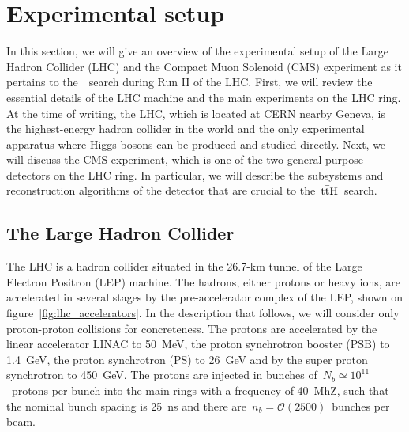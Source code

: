 \chapter{Experimental setup}
In this section, we will give an overview of the experimental setup of the Large Hadron Collider (LHC) and the Compact Muon Solenoid (CMS) experiment as it pertains to the~\ttH~search during Run II of the LHC. First, we will review the essential details of the LHC machine and the main experiments on the LHC ring. At the time of writing, the LHC, which is located at CERN nearby Geneva, is the highest-energy hadron collider in the world and the only experimental apparatus where Higgs bosons can be produced and studied directly. Next, we will discuss the CMS experiment, which is one of the two general-purpose detectors on the LHC ring. In particular, we will describe the subsystems and reconstruction algorithms of the detector that are crucial to the~$\mathrm{t} \bar{\mathrm{t}} \mathrm{H}$~search.

\section{The Large Hadron Collider}
The LHC is a hadron collider situated in the 26.7-km tunnel of the Large Electron Positron (LEP) machine. The hadrons, either protons or heavy ions, are accelerated in several stages by the pre-accelerator complex of the LEP, shown on figure~\cref{fig:lhc_accelerators}. In the description that follows, we will consider only proton-proton collisions for concreteness. The protons are accelerated by the linear accelerator LINAC to 50~MeV, the proton synchrotron booster (PSB) to 1.4~GeV, the proton synchrotron (PS) to 26~GeV and by the super proton synchrotron to 450~GeV. The protons are injected in bunches of~$N_b \simeq 10^{11}$~protons per bunch into the main rings with a frequency of 40~MhZ, such that the nominal bunch spacing is 25~ns and there are~$n_b=\mathcal{O}(2500)$~bunches per beam.

